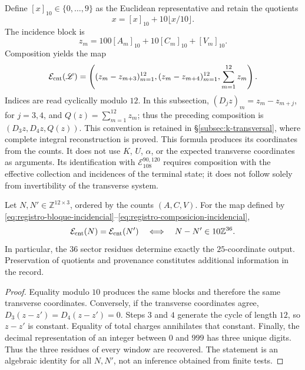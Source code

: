 Define \([x]_{10}\in\{0,\ldots,9\}\) as the Euclidean
representative and retain the quotients
\[
 x=[x]_{10}+10\lfloor x/10\rfloor.
\]
The incidence block is
\begin{equation}
 z_m=100[A_m]_{10}+10[C_m]_{10}+[V_m]_{10}.
 \label{eq:registro-bloque-incidencial}
\end{equation}
Composition yields the map
\begin{equation}
 \mathcal E_{\rm cnt}(\mathscr L)=
 \left((z_m-z_{m+3})_{m=1}^{12},
       (z_m-z_{m+4})_{m=1}^{12},\sum_{m=1}^{12}z_m\right).
\label{eq:registro-composicion-incidencial}
\end{equation}
Indices are read cyclically modulo \(12\). In this subsection,
\((D_jz)_m=z_m-z_{m+j}\), for \(j=3,4\), and
\(Q(z)=\sum_{m=1}^{12}z_m\); thus the preceding composition is
\((D_3z,D_4z,Q(z))\). This convention is retained in
\S\ref{subsec:k-transversal}, where complete integral reconstruction
is proved.
This formula produces its coordinates from the counts. It does not use
\(K\), \(U\), \(\alpha\), or the expected transverse coordinates
as arguments. Its identification with
\(\mathcal E_{108}^{90,120}\) requires composition with the effective collection and
incidences of the terminal state; it does not follow solely
from invertibility of the transverse system.

\begin{proposition}
\label{prop:registro-36-residuos}
Let \(N,N'\in\mathbb Z^{12\times3}\), ordered by the counts
\((A,C,V)\). For the map defined by
\eqref{eq:registro-bloque-incidencial}--\eqref{eq:registro-composicion-incidencial},
\[
 \mathcal E_{\rm cnt}(N)=\mathcal E_{\rm cnt}(N')
 \quad\Longleftrightarrow\quad
 N-N'\in10\mathbb Z^{36}.
\]
In particular, the \(36\) sector residues determine exactly
the \(25\)-coordinate output. Preservation of quotients and
provenance constitutes additional information in the record.
\end{proposition}

\begin{proof}
Equality modulo \(10\) produces the same blocks and therefore
the same transverse coordinates. Conversely, if the transverse
coordinates agree, \(D_3(z-z')=D_4(z-z')=0\). Steps
\(3\) and \(4\) generate the cycle of length \(12\), so
\(z-z'\) is constant. Equality of total charges annihilates that
constant. Finally, the decimal representation of an integer between
\(0\) and \(999\) has three unique digits. Thus the
three residues of every window are recovered. The statement is an algebraic identity
for all \(N,N'\), not an inference obtained from finite tests.
\end{proof}

